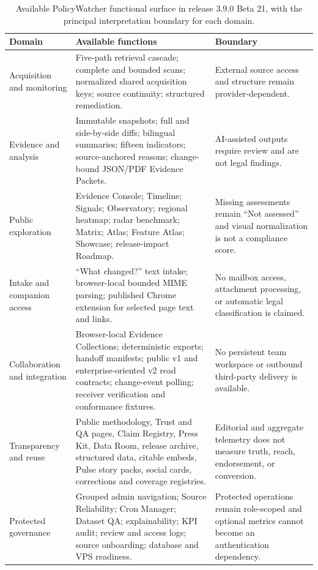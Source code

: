 \documentclass[11pt]{article}
\begin{document}
\begin{table}[htbp]
\centering
\small
\begin{tabularx}{\textwidth}{@{}l X X@{}}
\toprule
\textbf{Domain} & \textbf{Available functions} & \textbf{Boundary} \\
\midrule
Acquisition and monitoring & Five-path retrieval cascade; complete and bounded scans; normalized shared acquisition keys; source continuity; structured remediation. & External source access and structure remain provider-dependent. \\
\addlinespace
Evidence and analysis & Immutable snapshots; full and side-by-side diffs; bilingual summaries; fifteen indicators; source-anchored reasons; change-bound JSON/PDF Evidence Packets. & AI-assisted outputs require review and are not legal findings. \\
\addlinespace
Public exploration & Evidence Console; Timeline; Signals; Observatory; regional heatmap; radar benchmark; Matrix; Atlas; Feature Atlas; Showcase; release-impact Roadmap. & Missing assessments remain ``Not assessed'' and visual normalization is not a compliance score. \\
\addlinespace
Intake and companion access & ``What changed?'' text intake; browser-local bounded MIME parsing; published Chrome extension for selected page text and links. & No mailbox access, attachment processing, or automatic legal classification is claimed. \\
\addlinespace
Collaboration and integration & Browser-local Evidence Collections; deterministic exports; handoff manifests; public v1 and enterprise-oriented v2 read contracts; change-event polling; receiver verification and conformance fixtures. & No persistent team workspace or outbound third-party delivery is available. \\
\addlinespace
Transparency and reuse & Public methodology, Trust and QA pages, Claim Registry, Press Kit, Data Room, release archive, structured data, citable embeds, Pulse story packs, social cards, corrections and coverage registries. & Editorial and aggregate telemetry does not measure truth, reach, endorsement, or conversion. \\
\addlinespace
Protected governance & Grouped admin navigation; Source Reliability; Cron Manager; Dataset QA; explainability; KPI audit; review and access logs; source onboarding; database and VPS readiness. & Protected operations remain role-scoped and optional metrics cannot become an authentication dependency. \\
\bottomrule
\end{tabularx}
\caption{Available PolicyWatcher functional surface in release 3.9.0 Beta 21,
with the principal interpretation boundary for each domain.}
\label{tab:features}
\end{table}
\FloatBarrier
\end{document}
